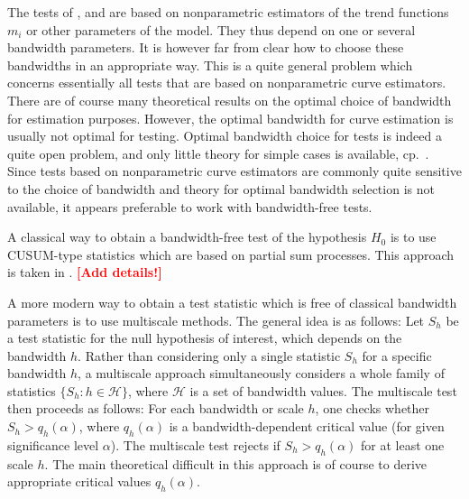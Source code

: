 \documentclass[a4paper,12pt]{article}
\begin{document}
The tests of \cite{Zhang2012}, \cite{DegrasWu2012} and \cite{ChenWu2018} are based on nonparametric estimators of the trend functions $m_i$ or other parameters of the model. They thus depend on one or several bandwidth parameters. It is however far from clear how to choose these bandwidths in an appropriate way. This is a quite general problem which concerns essentially all tests that are based on nonparametric curve estimators. There are of course many theoretical results on the optimal choice of bandwidth for estimation purposes. However, the optimal bandwidth for curve estimation is usually not optimal for testing. Optimal bandwidth choice for tests is indeed a quite open problem, and only little theory for simple cases is available, cp.\ \cite{GaoGijbels2008}. Since tests based on nonparametric curve estimators are commonly quite sensitive to the choice of bandwidth and theory for optimal bandwidth selection is not available, it appears preferable to work with bandwidth-free tests. 


A classical way to obtain a bandwidth-free test of the hypothesis $H_0$ is to use CUSUM-type statistics which are based on partial sum processes. This approach is taken in \cite{Hidalgo2014}. \textcolor{red}{\textbf{[Add details!]}}





A more modern way to obtain a test statistic which is free of classical bandwidth parameters is to use multiscale methods. The general idea is as follows: Let $S_h$ be a test statistic for the null hypothesis of interest, which depends on the bandwidth $h$. Rather than considering only a single statistic $S_h$ for a specific bandwidth $h$, a multiscale approach simultaneously considers a whole family of statistics $\{S_h: h \in \mathcal{H} \}$, where $\mathcal{H}$ is a set of bandwidth values. The multiscale test then proceeds as follows: For each bandwidth or scale $h$, one checks whether $S_h > q_h(\alpha)$, where $q_h(\alpha)$ is a bandwidth-dependent critical value (for given significance level $\alpha$). The multiscale test rejects if $S_h > q_h(\alpha)$ for at least one scale $h$. The main theoretical difficult in this approach is of course to derive appropriate critical values $q_h(\alpha)$. 
\end{document}

